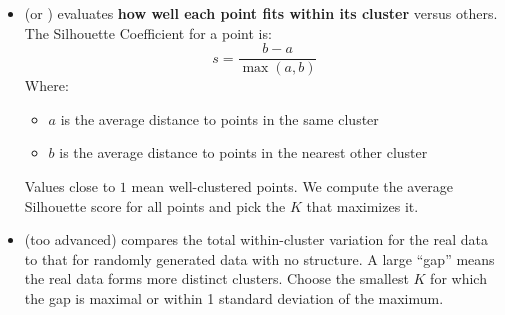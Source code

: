 \begin{itemize}
    \item {} (or ) evaluates \textbf{how well each point fits within its cluster} versus others. The Silhouette Coefficient for a point is:
    \begin{equation}
        s = \dfrac{b - a}{\max\left(a, b\right)}
    \end{equation}
    Where:
    \begin{itemize}
        \item $a$ is the average distance to points in the same cluster
        \item $b$ is the average distance to points in the nearest other cluster
    \end{itemize}
    Values close to $1$ mean well-clustered points. We compute the average Silhouette score for all points and pick the $K$ that maximizes it.
    \item {} (too advanced) compares the total within-cluster variation for the real data to that for randomly generated data with no structure. A large ``gap'' means the real data forms more distinct clusters. Choose the smallest $K$ for which the gap is maximal or within 1 standard deviation of the maximum.
\end{itemize}



